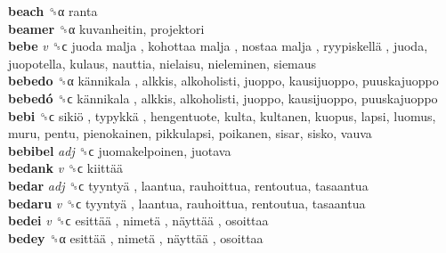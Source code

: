 \textbf{beach} ␝α  ranta  \\
\textbf{beamer} ␝α  kuvanheitin, projektori  \\
\textbf{bebe} \emph{v}  ␝ϲ   juoda malja ,  kohottaa malja ,  nostaa malja ,  ryypiskellä , juoda, juopotella, kulaus, nauttia, nielaisu, nieleminen, siemaus  \\
\textbf{bebedo} ␝α   kännikala , alkkis, alkoholisti, juoppo, kausijuoppo, puuskajuoppo  \\
\textbf{bebedó} ␝ϲ   kännikala , alkkis, alkoholisti, juoppo, kausijuoppo, puuskajuoppo  \\
\textbf{bebi} ␝ϲ   sikiö ,  typykkä , hengentuote, kulta, kultanen, kuopus, lapsi, luomus, muru, pentu, pienokainen, pikkulapsi, poikanen, sisar, sisko, vauva  \\
\textbf{bebibel} \emph{adj}  ␝ϲ  juomakelpoinen, juotava  \\
\textbf{bedank} \emph{v}  ␝ϲ   kiittää   \\
\textbf{bedar} \emph{adj}  ␝ϲ   tyyntyä , laantua, rauhoittua, rentoutua, tasaantua  \\
\textbf{bedaru} \emph{v}  ␝ϲ   tyyntyä , laantua, rauhoittua, rentoutua, tasaantua  \\
\textbf{bedei} \emph{v}  ␝ϲ   esittää ,  nimetä ,  näyttää , osoittaa  \\
\textbf{bedey} ␝α   esittää ,  nimetä ,  näyttää , osoittaa  \\
